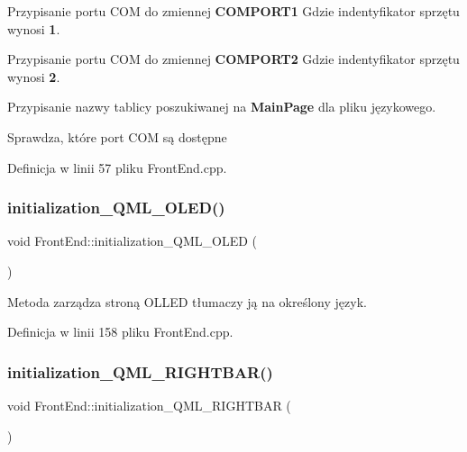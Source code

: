 Przypisanie portu C\+OM do zmiennej {\bfseries C\+O\+M\+P\+O\+R\+T1} Gdzie indentyfikator sprzętu wynosi {\bfseries 1}.

Przypisanie portu C\+OM do zmiennej {\bfseries C\+O\+M\+P\+O\+R\+T2} Gdzie indentyfikator sprzętu wynosi {\bfseries 2}.

Przypisanie nazwy tablicy poszukiwanej na {\bfseries Main\+Page} dla pliku językowego.

Sprawdza, które port C\+OM są dostępne 

Definicja w linii 57 pliku Front\+End.\+cpp.

\mbox{\label{class_front_end_space_1_1_front_end_aab9bd39c5661dd230c540acd1c55829f}} 
\subsubsection{\texorpdfstring{initialization\+\_\+\+Q\+M\+L\+\_\+\+O\+L\+E\+D()}{initialization\_QML\_OLED()}}
{\footnotesize\ttfamily void Front\+End\+::initialization\+\_\+\+Q\+M\+L\+\_\+\+O\+L\+ED (\begin{DoxyParamCaption}{ }\end{DoxyParamCaption})}

Metoda zarządza stroną O\+L\+L\+ED tłumaczy ją na określony język. 

Definicja w linii 158 pliku Front\+End.\+cpp.

\mbox{\label{class_front_end_space_1_1_front_end_ad34026be0b78307a93d7438fb0366a49}} 
\subsubsection{\texorpdfstring{initialization\+\_\+\+Q\+M\+L\+\_\+\+R\+I\+G\+H\+T\+B\+A\+R()}{initialization\_QML\_RIGHTBAR()}}
{\footnotesize\ttfamily void Front\+End\+::initialization\+\_\+\+Q\+M\+L\+\_\+\+R\+I\+G\+H\+T\+B\+AR (\begin{DoxyParamCaption}{ }\end{DoxyParamCaption})}

